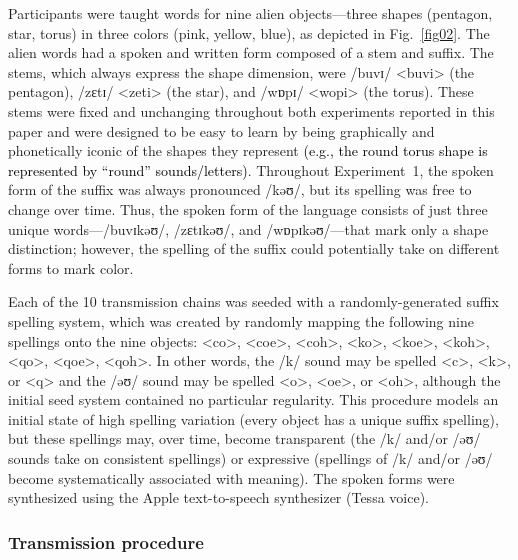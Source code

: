 \documentclass[doc,biblatex]{apa7}
\newcommand\newmaterial[1]{\textcolor{black}{#1}}
\begin{document}
Participants were taught words for nine alien objects---three shapes (pentagon, star, torus) in three colors (pink, yellow, blue), as depicted in Fig.~\ref{fig02}. The alien words had a spoken and written form composed of a stem and suffix. The stems, which always express the shape dimension, were /buvɪ/ <buvi> (the pentagon), /zɛtɪ/ <zeti> (the star), and /wɒpɪ/ <wopi> (the torus). These stems were fixed and unchanging throughout both experiments reported in this paper and were designed to be easy to learn by being graphically and phonetically iconic of the shapes they represent \newmaterial{(e.g., the round torus shape is represented by ``round'' sounds/letters)}. Throughout Experiment~1, the spoken form of the suffix was always pronounced /kəʊ/, but its spelling was free to change over time. Thus, the spoken form of the language consists of just three unique words---/buvɪkəʊ/, /zɛtɪkəʊ/, and /wɒpɪkəʊ/---that mark only a shape distinction; however, the spelling of the suffix could potentially take on different forms to mark color.

Each of the 10 transmission chains was seeded with a randomly-generated suffix spelling system, which was created by randomly mapping the following nine spellings onto the nine objects: <co>, <coe>, <coh>, <ko>, <koe>, <koh>, <qo>, <qoe>, <qoh>. In other words, the /k/ sound may be spelled <c>, <k>, or <q> and the /əʊ/ sound may be spelled <o>, <oe>, or <oh>, although the initial seed system contained no particular regularity. This procedure models an initial state of high spelling variation (every object has a unique suffix spelling), but these spellings may, over time, become transparent (the /k/ and/or /əʊ/ sounds take on consistent spellings) or expressive (spellings of /k/ and/or /əʊ/ become systematically associated with meaning). The spoken forms were synthesized using the Apple text-to-speech synthesizer (Tessa voice).

\subsubsection{Transmission procedure}
\end{document}
